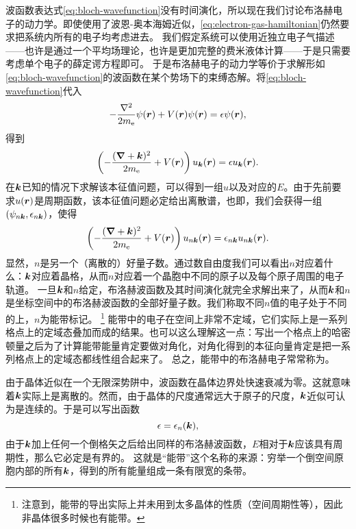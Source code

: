 波函数表达式\eqref{eq:bloch-wavefunction}没有时间演化，所以现在我们讨论布洛赫电子的动力学。即使使用了波恩-奥本海姆近似，\eqref{eq:electron-gas-hamiltonian}仍然要求把系统内所有的电子均考虑进去。
我们假定系统可以使用近独立电子气描述——也许是通过一个平均场理论，也许是更加完整的费米液体计算——于是只需要考虑单个电子的薛定谔方程即可。
于是布洛赫电子的动力学等价于求解形如\eqref{eq:bloch-wavefunction}的波函数在某个势场下的束缚态解。将\eqref{eq:bloch-wavefunction}代入
\[
    -\frac{\laplacian}{2m_\text{e}} \psi(\vb*{r}) + V(\vb*{r}) \psi(\vb*{r}) = \epsilon \psi(\vb*{r}),
\]
得到
\begin{equation}
    \left( - \frac{(\grad+\vb*{k})^2}{2m_\text{e}} + V(\vb*{r}) \right) u_{\vb*{k}}(\vb*{r}) = \epsilon u_{\vb*{k}}(\vb*{r}).
    \label{eq:block-energy-problem}
\end{equation}
在$\vb*{k}$已知的情况下求解该本征值问题，可以得到一组$u$以及对应的$E$。由于先前要求$u(\vb*{r})$是周期函数，该本征值问题必定给出离散谱，也即，我们会获得一组$(\psi_{n \vb*{k}}, \epsilon_{n \vb*{k}})$，使得
\begin{equation}
    \left( - \frac{(\grad+\vb*{k})^2}{2m_\text{e}} + V(\vb*{r}) \right) u_{n \vb*{k}}(\vb*{r}) = \epsilon_{n \vb*{k}} u_{n \vb*{k}}(\vb*{r}).
    \label{eq:eigen-function-bloch-u}
\end{equation}
显然，$n$是另一个（离散的）好量子数。通过数自由度我们可以看出$n$对应着什么：$\vb*{k}$对应着晶格，从而$n$对应着一个晶胞中不同的原子以及每个原子周围的电子轨道。
一旦$\vb*{k}$和$n$给定，布洛赫波函数及其时间演化就完全求解出来了，从而$\vb*{k}$和$n$是坐标空间中的布洛赫波函数的全部好量子数。我们称取不同$n$值的电子处于不同的上，$n$为能带标记。%
\footnote{注意到，能带的导出实际上并未用到太多晶体的性质（空间周期性等），因此非晶体很多时候也有能带。}%
能带中的电子在空间上非常不定域，它们实际上是一系列格点上的定域态叠加而成的结果。也可以这么理解这一点：写出一个格点上的哈密顿量之后为了计算能带能量肯定要做对角化，对角化得到的本征向量肯定是把一系列格点上的定域态都线性组合起来了。
总之，能带中的布洛赫电子常常称为。

由于晶体近似在一个无限深势阱中，波函数在晶体边界处快速衰减为零。这就意味着$\vb*{k}$实际上是离散的。然而，由于晶体的尺度通常远大于原子的尺度，$\vb*{k}$近似可认为是连续的。于是可以写出函数
\[
    \epsilon = \epsilon_n(\vb*{k}),
\]
由于$\vb*{k}$加上任何一个倒格矢之后给出同样的布洛赫波函数，$E$相对于$\vb*{k}$应该具有周期性，那么它必定是有界的。
这就是“能带”这个名称的来源：穷举一个倒空间原胞内部的所有$\vb*{k}$，得到的所有能量组成一条有限宽的条带。

